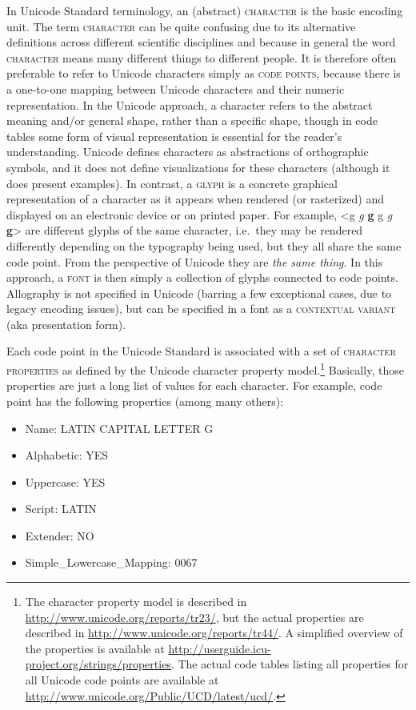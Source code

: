 In Unicode Standard terminology, an (abstract) \textsc{character} is the basic
encoding unit. The term \textsc{character} can be quite confusing due to its
alternative definitions across different scientific disciplines and because in
general the word \textsc{character} means many different things to different
people. It is therefore often preferable to refer to Unicode characters simply
as \textsc{code points}, because there is a one-to-one mapping between Unicode
characters and their numeric representation. In the Unicode approach, a
character refers to the abstract meaning and/or general shape, rather than a
specific shape, though in code tables some form of visual representation is
essential for the reader's understanding. Unicode defines characters as
abstractions of orthographic symbols, and it does not define visualizations for
these characters (although it does present examples). In contrast, a
\textsc{glyph} is a concrete graphical representation of a character as it
appears when rendered (or rasterized) and displayed on an electronic device or
on printed paper. For example, <g {\large \textit{g}} \textbf{g}
{ {\small g} \textit{g} \textbf{g}}> are different glyphs of the
same character, i.e.~they may be rendered differently depending on the
typography being used, but they all share the same code point. From the
perspective of Unicode they are \textit{the same thing}. In this approach, a
\textsc{font} is then simply a collection of glyphs connected to code points.
Allography is not specified in Unicode (barring a few exceptional cases, due
to legacy encoding issues), but can be specified in a font as a
\textsc{contextual variant} (aka presentation form).

Each code point in the Unicode Standard is associated with a set of
\textsc{character properties} as defined by the Unicode character property
model.\footnote{The character property model is described in
\url{http://www.unicode.org/reports/tr23/}, but the actual properties are
described in \url{http://www.unicode.org/reports/tr44/}. A simplified overview
of the properties is available at
\url{http://userguide.icu-project.org/strings/properties}. The actual code
tables listing all properties for all Unicode code points are available at
\url{http://www.unicode.org/Public/UCD/latest/ucd/}.} Basically, those
properties are just a long list of values for each character. For example, code
point  has the following properties (among many others): 
\begin{itemize}
	\item Name: LATIN CAPITAL LETTER G 
	\item Alphabetic: YES 
	\item Uppercase: YES 
	\item Script: LATIN 
	\item Extender: NO 
	\item Simple\_Lowercase\_Mapping: 0067 
\end{itemize}

